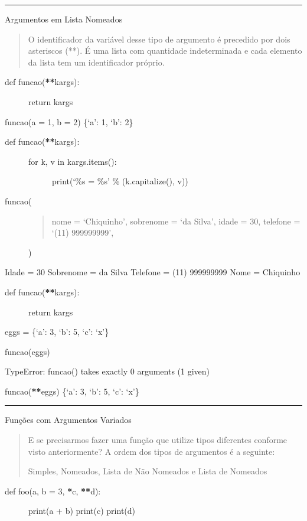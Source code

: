 \documentclass[letterpaper,10pt,brazil]{sphinxmanual}
\begin{document}
\bigskip\hrule\bigskip


Argumentos em Lista Nomeados
\begin{quote}

O identificador da variável desse tipo de argumento é precedido por dois asteriscos (**).
É uma lista com quantidade indeterminada e cada elemento da lista tem um identificador próprio.
\end{quote}
\begin{description}
\item[{def funcao({\color{red}\bfseries{}**}kargs):}] \leavevmode
return kargs

\end{description}

funcao(a = 1, b = 2)
\{‘a’: 1, ‘b’: 2\}
\begin{description}
\item[{def funcao({\color{red}\bfseries{}**}kargs):}] \leavevmode\begin{description}
\item[{for k, v in kargs.items():}] \leavevmode
print(‘\%s = \%s’ \% (k.capitalize(), v))

\end{description}

\item[{funcao(}] \leavevmode\begin{quote}

nome = ‘Chiquinho’,
sobrenome = ‘da Silva’,
idade = 30,
telefone = ‘(11) 99999\sphinxhyphen{}9999’,
\end{quote}

)

\end{description}

Idade = 30
Sobrenome = da Silva
Telefone = (11) 99999\sphinxhyphen{}9999
Nome = Chiquinho
\begin{description}
\item[{def funcao({\color{red}\bfseries{}**}kargs):}] \leavevmode
return kargs

\end{description}

eggs = \{‘a’: 3, ‘b’: 5, ‘c’: ‘x’\}

funcao(eggs)

TypeError: funcao() takes exactly 0 arguments (1 given)

funcao({\color{red}\bfseries{}**}eggs)
\{‘a’: 3, ‘b’: 5, ‘c’: ‘x’\}


\bigskip\hrule\bigskip


Funções com Argumentos Variados
\begin{quote}

E se precisarmos fazer uma função que utilize tipos diferentes conforme visto anteriormente?
A ordem dos tipos de argumentos é a seguinte:

Simples, Nomeados, Lista de Não Nomeados e Lista de Nomeados
\end{quote}
\begin{description}
\item[{def foo(a, b = 3, {\color{red}\bfseries{}*}c, {\color{red}\bfseries{}**}d):}] \leavevmode
print(a + b)
print(c)
print(d)

\end{description}
\end{document}
